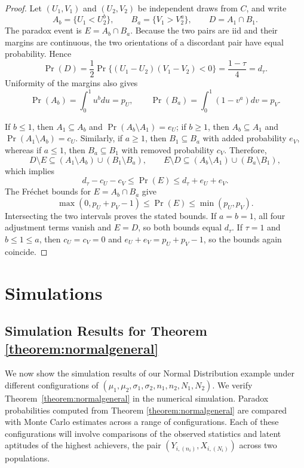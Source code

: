 \documentclass[12pt]{article}
\begin{document}
\begin{proof}
Let \((U_1,V_1)\) and \((U_2,V_2)\) be independent draws from \(C\), and
write
\[
A_b=\{U_1<U_2^b\},\qquad
B_a=\{V_1>V_2^a\},\qquad
D=A_1\cap B_1.
\]
The paradox event is \(E=A_b\cap B_a\). Because the two pairs are iid and
their margins are continuous, the two orientations of a discordant pair have
equal probability. Hence
\[
\Pr(D)=\frac12\Pr\{(U_1-U_2)(V_1-V_2)<0\}
=\frac{1-\tau}{4}=d_\tau.
\]
Uniformity of the margins also gives
\[
\Pr(A_b)=\int_0^1u^bdu=p_U,
\qquad
\Pr(B_a)=\int_0^1(1-v^a)dv=p_V.
\]

If \(b\leq1\), then \(A_1\subseteq A_b\) and
\(\Pr(A_b\setminus A_1)=e_U\); if \(b\geq1\), then
\(A_b\subseteq A_1\) and \(\Pr(A_1\setminus A_b)=c_U\). Similarly,
if \(a\geq1\), then \(B_1\subseteq B_a\) with added probability \(e_V\),
whereas if \(a\leq1\), then \(B_a\subseteq B_1\) with removed probability
\(c_V\). Therefore,
\[
D\setminus E
\subseteq (A_1\setminus A_b)\cup(B_1\setminus B_a),
\qquad
E\setminus D
\subseteq (A_b\setminus A_1)\cup(B_a\setminus B_1),
\]
which implies
\[
d_\tau-c_U-c_V\leq\Pr(E)\leq d_\tau+e_U+e_V.
\]
The Fr\'echet bounds for \(E=A_b\cap B_a\) give
\[
\max(0,p_U+p_V-1)\leq\Pr(E)\leq\min(p_U,p_V).
\]
Intersecting the two intervals proves the stated bounds. If \(a=b=1\), all
four adjustment terms vanish and \(E=D\), so both bounds equal \(d_\tau\).
If \(\tau=1\) and \(b\leq1\leq a\), then \(c_U=c_V=0\) and
\(e_U+e_V=p_U+p_V-1\), so the bounds again coincide.
\end{proof}


\section{Simulations}
\subsection{Simulation Results for Theorem \ref{theorem:normalgeneral}}
\label{simu_theorem}
We now show the simulation results of our Normal Distribution example under different configurations of $(\mu_1,\mu_2,\sigma_1,\sigma_2, n_1,n_2,N_1,N_2)$. We verify Theorem~\ref{theorem:normalgeneral} in the numerical simulation. Paradox probabilities computed from Theorem \ref{theorem:normalgeneral} are compared with Monte Carlo estimates across a range of configurations. Each of these configurations will involve comparisons of the observed statistics and latent aptitudes of the highest achievers, the pair $(Y_{i,(n_i)}, X_{i,(N_i)})$ across two populations.
\end{document}
